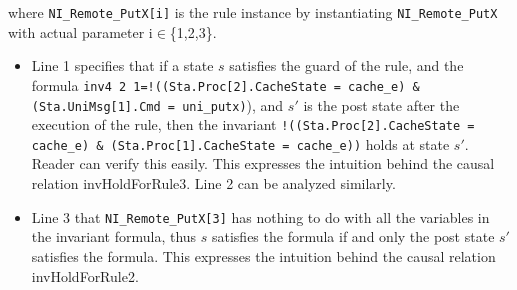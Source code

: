 \documentclass{llncs}
\begin{document}
where {\tt NI\_Remote\_PutX[i]} is the rule instance by instantiating {\tt NI\_Remote\_PutX} with actual parameter i$\in$\{1,2,3\}.
\begin{itemize}[noitemsep,nolistsep]
\item Line 1 specifies that if a state $s$ satisfies the guard of the rule, and the formula {\tt inv4 2 1=!((Sta.Proc[2].CacheState = cache\_e) \& (Sta.UniMsg[1].Cmd = uni\_putx)}), and $s'$ is the post state after the execution of the rule, then the invariant {\tt !((Sta.Proc[2].CacheState = cache\_e) \& (Sta.Proc[1].CacheState = cache\_e))} holds at state $s'$. Reader can verify this easily. This expresses the intuition behind the causal relation invHoldForRule3. Line 2 can be analyzed similarly.
 \item Line 3 that {\tt NI\_Remote\_PutX[3]} has nothing to do with all the variables in the invariant formula, thus $s$ satisfies the formula if and only the post state   $s'$ satisfies the formula. This expresses the intuition behind the causal relation invHoldForRule2.
\end{itemize}%
\end{document}
